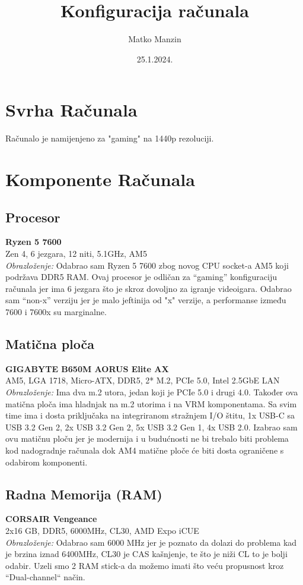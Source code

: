 \documentclass{article}
\title{Konfiguracija računala}
\author{Matko Manzin}
\date{25.1.2024.}
\begin{document}
\maketitle
\section*{Svrha Računala}
Računalo je namijenjeno za "gaming" na 1440p rezoluciji.

\section*{Komponente Računala}

\subsection*{Procesor}
\textbf{Ryzen 5 7600} \\
Zen 4, 6 jezgara, 12 niti, 5.1GHz, AM5 \\
\textit{Obrazloženje:} Odabrao sam Ryzen 5 7600 zbog novog CPU socket-a AM5 koji podržava DDR5 RAM. Ovaj procesor je odličan za “gaming” konfiguraciju računala jer ima 6 jezgara što je skroz dovoljno za igranje videoigara. Odabrao sam “non-x” verziju jer je malo jeftinija od "x" verzije, a performanse između 7600 i 7600x su marginalne.

\subsection*{Matična ploča}
\textbf{GIGABYTE B650M AORUS Elite AX} \\
AM5, LGA 1718, Micro-ATX, DDR5, 2* M.2, PCIe 5.0, Intel 2.5GbE LAN \\
\textit{Obrazloženje:} Ima dva m.2 utora, jedan koji je PCIe 5.0 i drugi 4.0. Također ova matična ploča ima hladnjak na m.2 utorima i na VRM komponentama. Sa svim time ima i dosta priključaka na integriranom stražnjem I/O štitu, 1x USB-C sa USB 3.2 Gen 2, 2x USB 3.2 Gen 2, 5x USB 3.2 Gen 1, 4x USB 2.0. Izabrao sam ovu matičnu ploču jer je modernija i u budućnosti ne bi trebalo biti problema kod nadogradnje računala dok AM4 matične ploče će biti dosta ograničene s odabirom komponenti.

\pagebreak
\subsection*{Radna Memorija (RAM)}
\textbf{CORSAIR Vengeance} \\
2x16 GB, DDR5, 6000MHz, CL30, AMD Expo iCUE \\
\textit{Obrazloženje:} Odabrao sam 6000 MHz jer je poznato da dolazi do problema kad je brzina iznad 6400MHz, CL30 je CAS kašnjenje, te što je niži CL to je bolji odabir. Uzeli smo 2 RAM stick-a da možemo imati što veću propusnost kroz “Dual-channel“ način.
\end{document}
